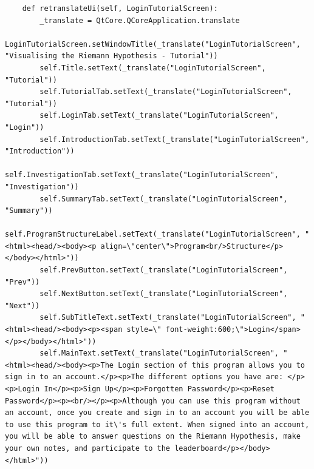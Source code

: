 \documentclass[12pt]{article}
\begin{document}
\begin{lstlisting}
    def retranslateUi(self, LoginTutorialScreen):
        _translate = QtCore.QCoreApplication.translate
        LoginTutorialScreen.setWindowTitle(_translate("LoginTutorialScreen", "Visualising the Riemann Hypothesis - Tutorial"))
        self.Title.setText(_translate("LoginTutorialScreen", "Tutorial"))
        self.TutorialTab.setText(_translate("LoginTutorialScreen", "Tutorial"))
        self.LoginTab.setText(_translate("LoginTutorialScreen", "Login"))
        self.IntroductionTab.setText(_translate("LoginTutorialScreen", "Introduction"))
        self.InvestigationTab.setText(_translate("LoginTutorialScreen", "Investigation"))
        self.SummaryTab.setText(_translate("LoginTutorialScreen", "Summary"))
        self.ProgramStructureLabel.setText(_translate("LoginTutorialScreen", "<html><head/><body><p align=\"center\">Program<br/>Structure</p></body></html>"))
        self.PrevButton.setText(_translate("LoginTutorialScreen", "Prev"))
        self.NextButton.setText(_translate("LoginTutorialScreen", "Next"))
        self.SubTitleText.setText(_translate("LoginTutorialScreen", "<html><head/><body><p><span style=\" font-weight:600;\">Login</span></p></body></html>"))
        self.MainText.setText(_translate("LoginTutorialScreen", "<html><head/><body><p>The Login section of this program allows you to sign in to an account.</p><p>The different options you have are: </p><p>Login In</p><p>Sign Up</p><p>Forgotten Password</p><p>Reset Password</p><p><br/></p><p>Although you can use this program without an account, once you create and sign in to an account you will be able to use this program to it\'s full extent. When signed into an account, you will be able to answer questions on the Riemann Hypothesis, make your own notes, and participate to the leaderboard</p></body></html>"))
\end{lstlisting}
\end{document}
